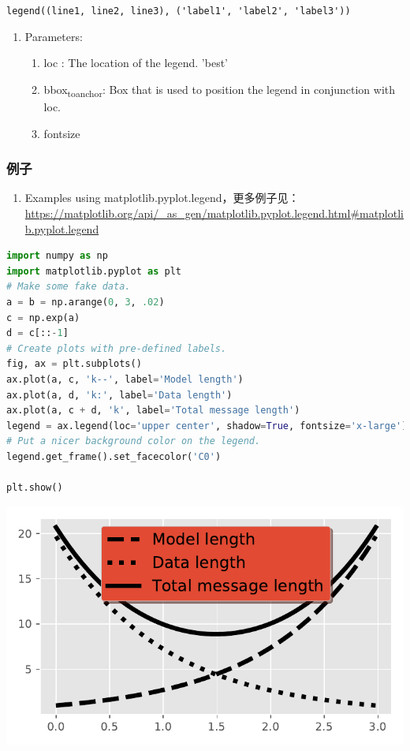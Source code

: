 \documentclass[UTF8,a4paper,12pt]{ctexart}  %
\providecommand{\tightlist}{\setlength{\itemsep}{0pt}\setlength{\parskip}{0pt}}
\newcommand{\passthrough}[1]{\lstset{mathescape=false}#1\lstset{mathescape=true}}
\begin{document}
\passthrough{\lstinline!legend((line1, line2, line3), ('label1', 'label2', 'label3'))!}

\begin{enumerate}
\def\labelenumi{\arabic{enumi}.}
\tightlist
\item
  Parameters:

  \begin{enumerate}
  \def\labelenumii{\arabic{enumii}.}
  \tightlist
  \item
    loc : The location of the legend. 'best'
  \item
    bbox\textsubscript{toanchor}: Box that is used to position the legend in
    conjunction with loc.
  \item
    fontsize
  \end{enumerate}
\end{enumerate}

\hypertarget{ux4f8bux5b50-8}{%
\subsubsection{例子}\label{ux4f8bux5b50-8}}

\begin{enumerate}
\def\labelenumi{\arabic{enumi}.}
\tightlist
\item
  Examples using matplotlib.pyplot.legend，更多例子见：
  \url{https://matplotlib.org/api/_as_gen/matplotlib.pyplot.legend.html\#matplotlib.pyplot.legend}
\end{enumerate}

\begin{lstlisting}[language=Python]
import numpy as np
import matplotlib.pyplot as plt
# Make some fake data.
a = b = np.arange(0, 3, .02)
c = np.exp(a)
d = c[::-1]
# Create plots with pre-defined labels.
fig, ax = plt.subplots()
ax.plot(a, c, 'k--', label='Model length')
ax.plot(a, d, 'k:', label='Data length')
ax.plot(a, c + d, 'k', label='Total message length')
legend = ax.legend(loc='upper center', shadow=True, fontsize='x-large')
# Put a nicer background color on the legend.
legend.get_frame().set_facecolor('C0')

plt.show()
\end{lstlisting}

\begin{center}\includegraphics[width=0.9\linewidth]{python-visualization_files/figure-latex/unnamed-chunk-47-1} \end{center}
\end{document}
